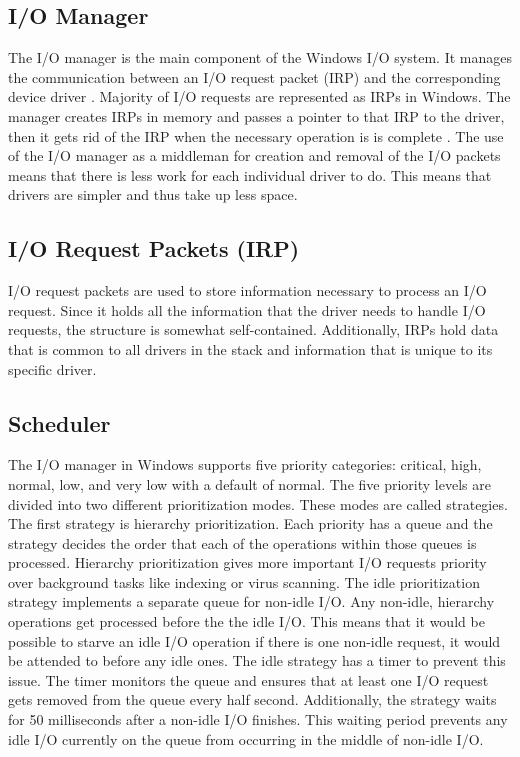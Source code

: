 \subsection{I/O Manager}
The I/O manager is the main component of the Windows I/O system. It manages the communication between an I/O request packet (IRP) and the corresponding device driver \cite{WindowsText}. Majority of I/O requests are represented as IRPs in Windows. The manager creates IRPs  in memory and passes a pointer to that IRP to the driver, then it gets rid of the IRP when the necessary operation is is complete \cite{WindowsText}. The use of the I/O manager as a middleman for creation and removal of the I/O packets means that there is less work for each individual driver to do. This means that drivers are simpler and thus take up less space. 

\subsection{I/O Request Packets (IRP)}
I/O request packets are used to store information necessary to process an I/O request. Since it holds all the information that the driver needs to handle I/O requests, the structure is somewhat self-contained. Additionally, IRPs hold data that is common to all drivers in the stack and information that is unique to its specific driver\cite{WindowsText}.

\subsection{Scheduler}
The I/O manager in Windows supports five priority categories: critical, high, normal, low, and very low with a default of normal\cite{WindowsText}. The five priority levels are divided into two different prioritization modes. These modes are called strategies. The first strategy is hierarchy prioritization. Each priority has a queue and the strategy decides the order that each of the operations within those queues is processed. Hierarchy prioritization gives more important I/O requests priority over background tasks like indexing or virus scanning. The idle prioritization strategy implements a separate queue for non-idle I/O. Any non-idle, hierarchy operations get processed before the the idle I/O\cite{WindowsText}. This means that it would be possible to starve an idle I/O operation if there is one non-idle request, it would be attended to before any idle ones. The idle strategy has a timer to prevent this issue. The timer monitors the queue and ensures that at least one I/O request gets removed from the queue every half second\cite{WindowsText}. Additionally, the strategy waits for 50 milliseconds after a non-idle I/O finishes\cite{WindowsText}. This waiting period prevents any idle I/O currently on the queue from occurring in the middle of non-idle I/O.  

